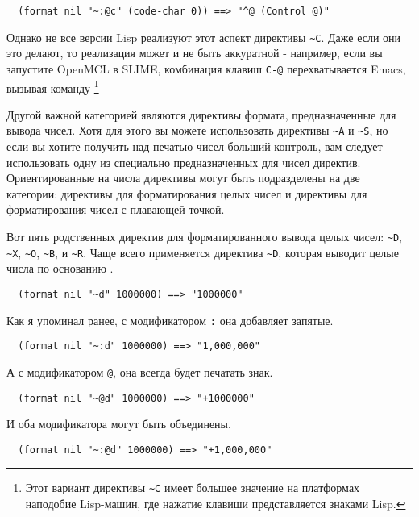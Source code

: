 {\begin{verbatim}
  (format nil "~:@c" (code-char 0)) ==> "^@ (Control @)"
\end{verbatim}

Однако не все версии Lisp реализуют этот аспект директивы \lstinline!~C!. Даже если они
это делают, то реализация может и не быть аккуратной - например, если вы запустите OpenMCL
в SLIME, комбинация клавиш \lstinline!C-@! перехватывается Emacs, вызывая команду
\footnote{Этот вариант директивы \lstinline!~C! имеет большее
  значение на платформах наподобие Lisp-машин, где нажатие клавиши представляется знаками
  Lisp.}
	
Другой важной категорией являются директивы формата, предназначенные для вывода
чисел. Хотя для этого вы можете использовать директивы \lstinline!~A! и \lstinline!~S!, но
если вы хотите получить над печатью чисел больший контроль, вам следует использовать одну
из специально предназначенных для чисел директив. Ориентированные на числа директивы могут
быть подразделены на две категории: директивы для форматирования целых чисел и директивы
для форматирования чисел с плавающей точкой.

Вот пять родственных директив для форматированного вывода целых чисел: \lstinline!~D!,
\lstinline!~X!, \lstinline!~O!, \lstinline!~B!, и \lstinline!~R!. Чаще всего применяется
директива \lstinline!~D!, которая выводит целые числа по основанию .

\begin{verbatim}
  (format nil "~d" 1000000) ==> "1000000"
\end{verbatim}

Как я упоминал ранее, с модификатором \lstinline!:! она добавляет запятые.

\begin{verbatim}
  (format nil "~:d" 1000000) ==> "1,000,000"
\end{verbatim}

А с модификатором \lstinline!@!, она всегда будет печатать знак.

\begin{verbatim}
  (format nil "~@d" 1000000) ==> "+1000000"
\end{verbatim}

И оба модификатора могут быть объединены.

\begin{verbatim}
  (format nil "~:@d" 1000000) ==> "+1,000,000"
\end{verbatim}

}
